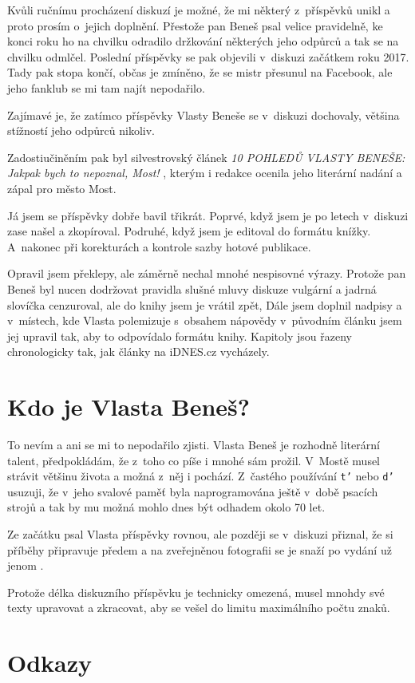 Kvůli ručnímu procházení diskuzí je možné, že mi některý z~příspěvků unikl a
proto prosím o~jejich doplnění. Přestože pan Beneš psal velice pravidelně, ke
konci roku ho na chvilku odradilo držkování některých jeho odpůrců a tak se na
chvilku odmlčel. Poslední příspěvky se pak objevili v~diskuzi začátkem roku
2017. Tady pak stopa končí, občas je zmíněno, že se mistr přesunul na Facebook,
ale jeho fanklub se mi tam najít nepodařilo.

Zajímavé je, že zatímco příspěvky Vlasty Beneše se v~diskuzi dochovaly, většina
stížností jeho odpůrců nikoliv.

Zadostiučiněním pak byl silvestrovský článek {\em 10 POHLEDŮ VLASTY BENEŠE:
Jakpak bych to nepoznal, Most!} , kterým i redakce
ocenila jeho literární nadání a zápal pro město Most.

Já jsem se příspěvky dobře bavil třikrát. Poprvé, když jsem je po letech
v~diskuzi zase našel a zkopíroval. Podruhé, když jsem je editoval do formátu
knížky. A~nakonec při korekturách a kontrole sazby hotové publikace.

Opravil jsem překlepy, ale záměrně nechal mnohé nespisovné výrazy. Protože pan
Beneš byl nucen dodržovat pravidla slušné mluvy diskuze vulgární a jadrná
slovíčka cenzuroval, ale do knihy jsem je vrátil zpět,  Dále jsem doplnil
nadpisy a v~místech, kde Vlasta polemizuje s~obsahem nápovědy v~původním článku
jsem jej upravil tak, aby to odpovídalo formátu knihy. Kapitoly jsou řazeny
chronologicky tak, jak články na iDNES.cz vycházely.

\section{Kdo je Vlasta Beneš?}

To nevím a ani se mi to nepodařilo zjisti. Vlasta Beneš je rozhodně literární
talent, předpokládám, že z~toho co píše i mnohé sám prožil. V~Mostě musel
strávit většinu života a možná z~něj i pochází. Z~častého používání {\tt t'}
nebo {\tt d'} usuzuji, že v~jeho svalové paměť byla naprogramována ještě v~době
psacích strojů a tak by mu možná mohlo dnes být odhadem okolo 70 let.

Ze začátku psal Vlasta příspěvky rovnou, ale později se v~diskuzi přiznal, že
si příběhy připravuje předem a na zveřejněnou fotografii se je snaží po vydání
už jenom .

Protože délka diskuzního příspěvku je technicky omezená, musel mnohdy své texty
upravovat a zkracovat, aby se vešel do limitu maximálního počtu znaků.

\section{Odkazy}




